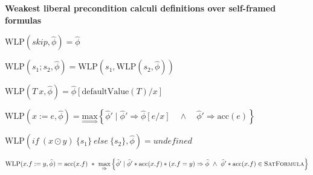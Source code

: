 \documentclass {article}
\newcommand{\eif}[3]{if \ ( #1 ) \ \{ #2 \} \ else \ \{#3\}}
\newcommand{\fphi}{\widehat{\phi}}
\newcommand{\acc}[1]{\text{acc}(#1)}
\newcommand{\imp}{\Rightarrow}
\newcommand{\maximp}[2]{\underset{\Rightarrow}{\text{max}}\left\{#1 \mid #2\right\}}
\newcommand{\wlp}[2]{\text{WLP}(#1,#2)}
\newcommand{\satdef}{\textsc{SatFormula}}
\begin{document}

\begin{center}
\textbf{Weakest liberal precondition calculi definitions over self-framed formulas}
\end{center}

$\wlp{skip}{\fphi} = \fphi  $

\vspace{0.5cm}

$\wlp{s_1;s_2}{\fphi} = \wlp{s_1}{\wlp{s_2}{\fphi}} $

\vspace{0.5cm}

$\wlp{T\ x}{\fphi} = \fphi\left[\text{defaultValue}(T)/x\right] $

\vspace{0.5cm}

$\wlp{x := e}{\fphi} =\maximp{\fphi'}{\fphi' \imp \fphi[e/x] \quad \wedge \quad \fphi' \imp \acc{e}} $

\vspace{0.5cm}

$\wlp{\eif{x \odot y}{s_1}{s_2}}{\fphi} = undefined $ 


\vspace{0.5cm}

$\wlp{x.f := y}{\fphi} = \acc{x.f} \ \ast \ \maximp{\fphi'}{\fphi' \ast \acc{x.f} \ast (x.f = y) \imp \fphi \ \wedge \ \fphi' * \acc{x.f} \in \satdef} $
\end{document}
